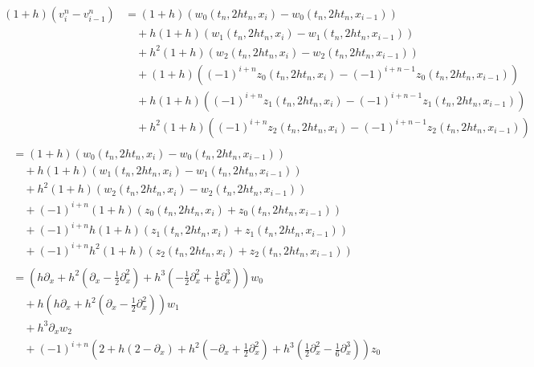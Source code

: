 {\small
\begin{align}
\begin{split}
(1 + h) \left(v^n_i - v^n_{i-1}\right) &= (1 + h) \left( w_0(t_n, 2 h t_n, x_i) - w_0(t_n, 2 h t_n, x_{i-1}) \right)\\
&\quad + h (1+h) \left( w_1(t_n, 2 h t_n, x_i) - w_1(t_n, 2 h t_n, x_{i-1}) \right)\\
&\quad + h^2 (1+h) \left( w_2(t_n, 2 h t_n, x_i) - w_2(t_n, 2 h t_n, x_{i-1}) \right)\\
&\quad + (1+h) \left( (-1)^{i+n} z_0(t_n, 2 h t_n, x_i) - (-1)^{i+n-1} z_0(t_n, 2 h t_n, x_{i-1}) \right)\\
&\quad + h (1 + h) \left( (-1)^{i+n} z_1(t_n, 2 h t_n, x_i) - (-1)^{i+n-1} z_1(t_n, 2 h t_n, x_{i-1}) \right)\\
&\quad + h^2 (1 + h) \left( (-1)^{i+n} z_2(t_n, 2 h t_n, x_i) - (-1)^{i+n-1} z_2(t_n, 2 h t_n, x_{i-1}) \right)
\end{split}\\
\begin{split}
&= (1 + h) \left( w_0(t_n, 2 h t_n, x_i) - w_0(t_n, 2 h t_n, x_{i-1}) \right)\\
&\quad + h (1+h) \left( w_1(t_n, 2 h t_n, x_i) - w_1(t_n, 2 h t_n, x_{i-1}) \right)\\
&\quad + h^2 (1+h) \left( w_2(t_n, 2 h t_n, x_i) - w_2(t_n, 2 h t_n, x_{i-1}) \right)\\
&\quad + (-1)^{i+n} (1+h) \left(  z_0(t_n, 2 h t_n, x_i) + z_0(t_n, 2 h t_n, x_{i-1}) \right)\\
&\quad + (-1)^{i+n} h (1 + h) \left( z_1(t_n, 2 h t_n, x_i) + z_1(t_n, 2 h t_n, x_{i-1}) \right)\\
&\quad + (-1)^{i+n} h^2 (1 + h) \left( z_2(t_n, 2 h t_n, x_i) + z_2(t_n, 2 h t_n, x_{i-1}) \right)
\end{split}\\
\begin{split}
&= \left( h \partial_x + h^2  \left( \partial_x - \frac{1}{2} \partial^2_x \right) + h^3 \left(- \frac{1}{2} \partial^2_x + \frac{1}{6} \partial^3_x \right) \right) w_0\\
&\quad + h \left( h \partial_x + h^2  \left( \partial_x - \frac{1}{2} \partial^2_x \right) \right) w_1\\
&\quad + h^3 \partial_x  w_2\\
&\quad + (-1)^{i+n} \left( 2 + h( 2 - \partial_x ) + h^2  \left( -\partial_x + \frac{1}{2} \partial^2_x \right) + h^3 \left(\frac{1}{2} \partial^2_x - \frac{1}{6} \partial^3_x \right) \right) z_0\\

\end{split}
\end{align}}
